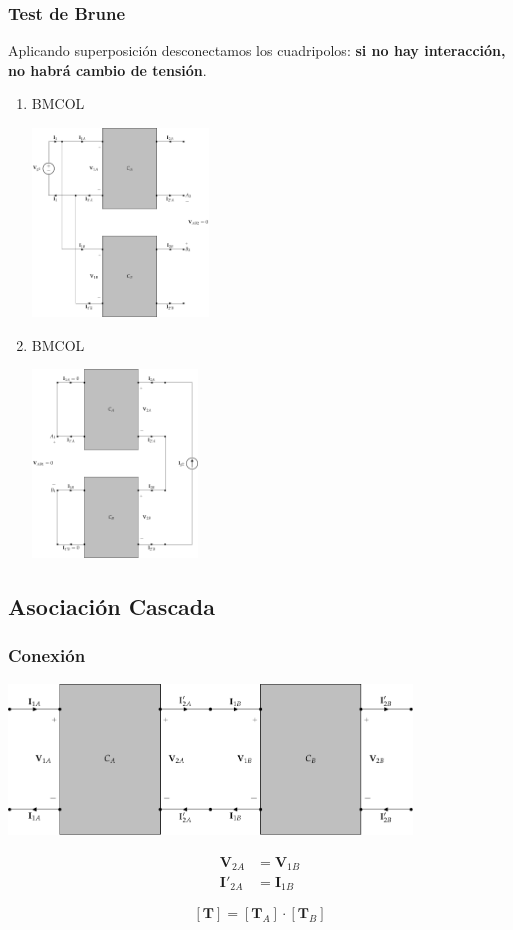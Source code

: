 \subsubsection{Test de Brune}
\label{sec:org7667a46}
Aplicando superposición desconectamos los cuadripolos: \textbf{si no hay interacción, no habrá cambio de tensión}.
\begin{enumerate}
\item \hfill{}\textsc{BMCOL}
\label{sec:orga5560fd}
\begin{center}
\includegraphics[height=5cm]{../figs/paralelo-serie-brune-entrada.pdf}
\end{center}
\item \hfill{}\textsc{BMCOL}
\label{sec:org4d90737}
\begin{center}
\includegraphics[height=5cm]{../figs/paralelo-serie-brune-salida.pdf}
\end{center}
\end{enumerate}
\subsection{Asociación Cascada}
\label{sec:org0d5b08b}

\subsubsection{Conexión}
\label{sec:org41e64cd}
\begin{center}
\includegraphics[height=4cm]{../figs/cascada.pdf}
\end{center}

\begin{align*}
  \mathbf{V}_{2A} &= \mathbf{V}_{1B}\\
  \mathbf{I}'_{2A} &= \mathbf{I}_{1B}
\end{align*}


\[
  \boxed{[\mathbf{T}] = [\mathbf{T}_A] \cdot [\mathbf{T}_B]}
\]

